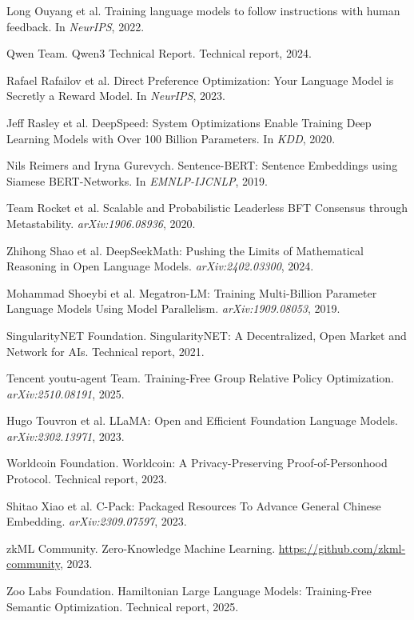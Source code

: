 \documentclass[11pt,a4paper]{article}
\begin{document}
\begin{thebibliography}{99}
Long Ouyang et al.
\newblock Training language models to follow instructions with human feedback.
\newblock In \textit{NeurIPS}, 2022.

Qwen Team.
\newblock Qwen3 Technical Report.
\newblock Technical report, 2024.

Rafael Rafailov et al.
\newblock Direct Preference Optimization: Your Language Model is Secretly a Reward Model.
\newblock In \textit{NeurIPS}, 2023.

Jeff Rasley et al.
\newblock DeepSpeed: System Optimizations Enable Training Deep Learning Models with Over 100 Billion Parameters.
\newblock In \textit{KDD}, 2020.

Nils Reimers and Iryna Gurevych.
\newblock Sentence-BERT: Sentence Embeddings using Siamese BERT-Networks.
\newblock In \textit{EMNLP-IJCNLP}, 2019.

Team Rocket et al.
\newblock Scalable and Probabilistic Leaderless BFT Consensus through Metastability.
\newblock \textit{arXiv:1906.08936}, 2020.

Zhihong Shao et al.
\newblock DeepSeekMath: Pushing the Limits of Mathematical Reasoning in Open Language Models.
\newblock \textit{arXiv:2402.03300}, 2024.

Mohammad Shoeybi et al.
\newblock Megatron-LM: Training Multi-Billion Parameter Language Models Using Model Parallelism.
\newblock \textit{arXiv:1909.08053}, 2019.

SingularityNET Foundation.
\newblock SingularityNET: A Decentralized, Open Market and Network for AIs.
\newblock Technical report, 2021.

Tencent youtu-agent Team.
\newblock Training-Free Group Relative Policy Optimization.
\newblock \textit{arXiv:2510.08191}, 2025.

Hugo Touvron et al.
\newblock LLaMA: Open and Efficient Foundation Language Models.
\newblock \textit{arXiv:2302.13971}, 2023.

Worldcoin Foundation.
\newblock Worldcoin: A Privacy-Preserving Proof-of-Personhood Protocol.
\newblock Technical report, 2023.

Shitao Xiao et al.
\newblock C-Pack: Packaged Resources To Advance General Chinese Embedding.
\newblock \textit{arXiv:2309.07597}, 2023.

zkML Community.
\newblock Zero-Knowledge Machine Learning.
\newblock \url{https://github.com/zkml-community}, 2023.

Zoo Labs Foundation.
\newblock Hamiltonian Large Language Models: Training-Free Semantic Optimization.
\newblock Technical report, 2025.

\end{thebibliography}
\end{document}
